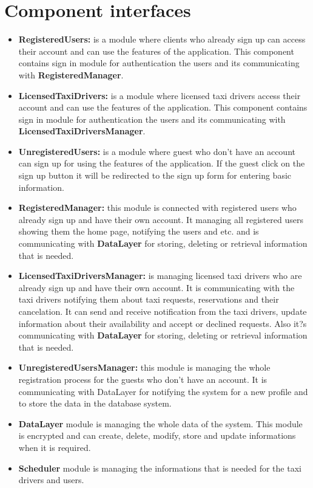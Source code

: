 \documentclass[12pt, oneside]{book}   	%
\begin{document}
\section{Component interfaces}
\begin{itemize}
\item \textbf{RegisteredUsers: }is a module where clients who already sign up can access their account and can use the features of the application. This component contains sign in module for authentication the users and its communicating with \textbf{RegisteredManager}.
\item \textbf{LicensedTaxiDrivers: }is a module where licensed taxi drivers access their account and can use the features of the application. This component contains sign in module for authentication the users and its communicating with \textbf{LicensedTaxiDriversManager}.
\item \textbf{UnregisteredUsers: }is a module where guest who don't have an account can sign up for using the features of the application. If the guest click on the sign up button it will be redirected to the sign up form for entering basic information. 
\item \textbf{RegisteredManager: } this module is connected with registered users who already sign up and have their own account. It managing all registered users showing them the home page, notifying the users and etc. and is communicating with \textbf{DataLayer} for storing, deleting or retrieval information that is needed.  
\item \textbf{LicensedTaxiDriversManager: }is managing licensed taxi drivers who are already sign up and have their own account. It is communicating with the taxi drivers notifying them about taxi requests, reservations and their cancelation. It can send and receive notification from the taxi drivers, update information about their availability and accept or declined requests. Also it?s communicating with \textbf{DataLayer} for storing, deleting or retrieval information that is needed. 
\item \textbf{UnregisteredUsersManager: }this module is managing the whole registration process for the guests who don't have an account. It is communicating with DataLayer for notifying the system for a new profile and to store the data in the database system. 
\item \textbf{DataLayer }module is managing the whole data of the system. This module is encrypted and can create, delete, modify, store and update informations when it is required.
\item \textbf{Scheduler }module is managing the informations that is needed for the taxi drivers and users. 

\end{itemize}
\end{document}
